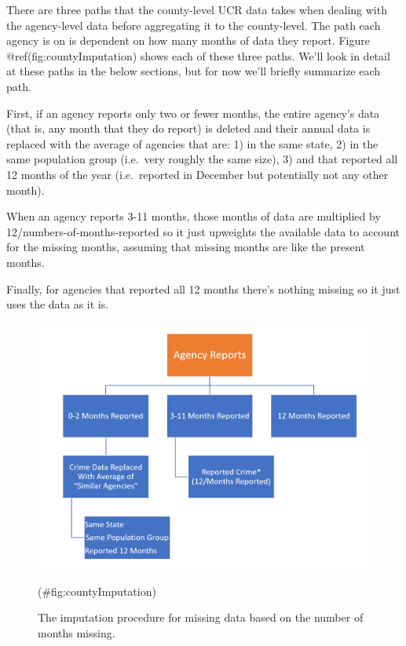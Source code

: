 \documentclass[
  12pt,
  openany]{book}
\begin{document}
There are three paths that the county-level UCR data takes when dealing with the agency-level data before aggregating it to the county-level. The path each agency is on is dependent on how many months of data they report. Figure @ref(fig:countyImputation) shows each of these three paths. We'll look in detail at these paths in the below sections, but for now we'll briefly summarize each path.

First, if an agency reports only two or fewer months, the entire agency's data (that is, any month that they do report) is deleted and their annual data is replaced with the average of agencies that are: 1) in the same state, 2) in the same population group (i.e.~very roughly the same size), 3) and that reported all 12 months of the year (i.e.~reported in December but potentially not any other month).

When an agency reports 3-11 months, those months of data are multiplied by 12/numbers-of-months-reported so it just upweights the available data to account for the missing months, assuming that missing months are like the present months.

Finally, for agencies that reported all 12 months there's nothing missing so it just uses the data as it is.

\begin{figure}

{\centering \includegraphics[width=0.9\linewidth]{images/segments_flowchart} 

}

\caption{The imputation procedure for missing data based on the number of months missing.}(\#fig:countyImputation)
\end{figure}
\end{document}
